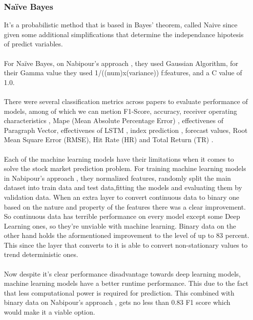 \documentclass[conference]{IEEEtran}
\begin{document}
\subsubsection{Naïve Bayes}
It's a probabilistic method that is based in Bayes' theorem, called Naive since given some additional simplifications that determine
the independance hipotesis of predict variables.
\\\\
For Naïve Bayes, on Nabipour's approach \cite{nabipour2020predicting}, they used Gaussian Algorithm, for their Gamma value they used 1/((num)x(variance)) f:features, and a C value of 1.0.
\\\\
There were several classification metrics across papers to evaluate performance of models,
among of which we can metion F1-Score, accuracy, receiver operating characteristics \cite{nabipour2020predicting},
Mape (Mean Absolute Percentage Error) \cite{M2018}, effectivenes of Paragraph Vector, effectivenes of LSTM \cite{Akita2016}, index prediction \cite{Vargas2017},
forecast values, Root Mean Square Error (RMSE), Hit Rate (HR) and Total Return (TR) \cite{Singh2016}.
\\\\
Each of the machine learning models have their limitations when it comes to solve the stock market prediction problem.
For training machine learning models in Nabipour's approach \cite{nabipour2020predicting}, they normalized features, randomly split 
the main dataset into train data and test data,fitting the models and evaluating them by validation data. When an extra layer to convert continuous data to binary
one based on the nature and property of the features there was a clear improvement. So continuous data has terrible performance on every model except some Deep Learning ones, so they're unviable with machine learning. Binary data on the other hand holds the aformentioned
improvement to the level of up to 83 percent. This since the layer that converts to it is able to convert non-stationary values to trend deterministic ones.
\\\\
Now despite it's clear performance disadvantage towards deep learning models, machine learning models have a better runtime performance. This due to the fact
that less computational power is required for prediction. This combined with binary data on Nabipour's approach \cite{nabipour2020predicting}, gets no less than 0.83 F1 score which would make it
a viable option.
\end{document}
